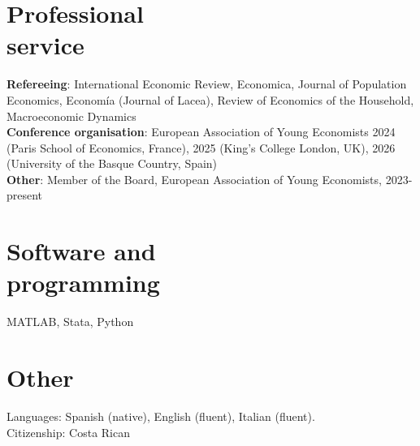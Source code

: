 \documentclass[margin]{res} %
\begin{document}
\begin{resume}
%

\section{Professional \\ service}
\textbf{Refereeing}: International Economic Review, Economica, Journal of Population Economics, Econom\'ia (Journal of Lacea), Review of Economics of the Household, Macroeconomic Dynamics \\
\textbf{Conference organisation}: European Association of Young Economists 2024 (Paris School of Economics, France), 2025 (King's College London, UK), 2026 (University of the Basque Country, Spain) 
\\
\textbf{Other}: Member of the Board, European Association of Young Economists, 2023-present

\section{Software and \\ programming}
MATLAB, Stata, Python \\

\section{Other}
Languages: Spanish (native), English (fluent), Italian (fluent). \\
Citizenship: Costa Rican




\end{resume}
\end{document}
